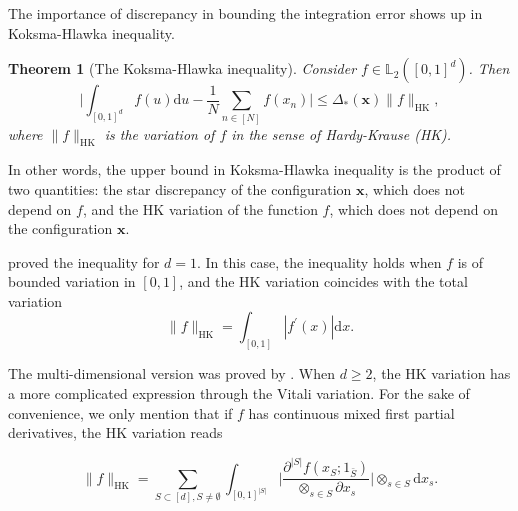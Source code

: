 \documentclass[twoside,11pt]{book}
\newtheorem{theorem}{Theorem}
\numberwithin{theorem}{chapter}
\numberwithin{definition}{chapter}
\numberwithin{proposition}{chapter}
\numberwithin{corollary}{chapter}
\numberwithin{example}{chapter}
\numberwithin{lemma}{chapter}
\numberwithin{assumption}{chapter}
\begin{document}

The importance of discrepancy in bounding the integration error shows up in Koksma-Hlawka inequality.


\begin{theorem}[The Koksma-Hlawka inequality]\label{thm:KH_ineq}
Consider $f \in \mathbb{L}_{2}([0,1]^{d})$. Then 
\begin{equation}\label{eq:KH_ineq}
\bigg| \int_{[0,1]^{d}} f(u) \mathrm{d}u - \frac{1}{N} \sum\limits_{n \in [N]}  f(x_{n})\bigg| \leq \Delta_{*}(\bm{x}) \|f\|_{\mathrm{HK}},
\end{equation}
where $\|f\|_{\mathrm{HK}}$ is the variation of $f$ in the sense of Hardy-Krause (HK). 


\end{theorem}

In other words, the upper bound in Koksma-Hlawka inequality is the product of two quantities: the star discrepancy of the configuration $\bm{x}$, which does not depend on $f$, and the HK variation of the function $f$, which does not depend on the configuration $\bm{x}$. 

\cite{Kok42} proved the inequality for $d=1$. In this case, the inequality holds when $f$ is of bounded variation in $[0,1]$, and the HK variation coincides with the total variation
\begin{equation}
\|f\|_{\mathrm{HK}} = \int_{[0,1]}|f^{'}(x)| \mathrm{d}x.
\end{equation}


The multi-dimensional version was proved by \cite{Hla61}. When $d \geq 2$, the HK variation has a more complicated expression through the Vitali variation. For the sake of convenience, we only mention that if $f$ has continuous mixed first partial derivatives, the HK variation reads

\begin{equation}
\|f\|_{\mathrm{HK}} = \sum\limits_{S \subset[d], S \neq \emptyset} \int_{[0,1]^{|S|}} \bigg|\frac{\partial^{|S|} f (x_S;1_{\bar{S}})}{\otimes_{s \in S}\partial x_{s}} \bigg| \otimes_{s \in S}\mathrm{d} x_{s}.
\end{equation}
\end{document}
